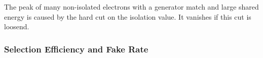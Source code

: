 \documentclass{cmspaper}
\begin{document}

The peak of many non-isolated electrons with a generator match and large shared energy is caused by the hard cut on the isolation value. It vanishes if this cut is loosend.


\subsubsection{Selection Efficiency and Fake Rate}
\end{document}
